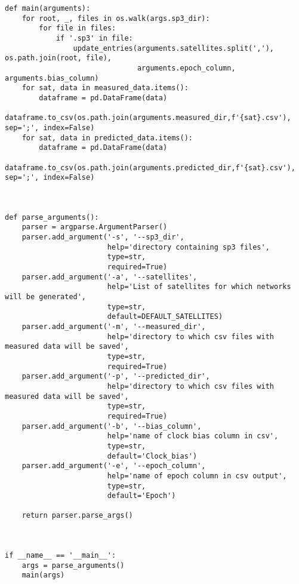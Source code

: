 \begin{lstlisting}[frame=single]
def main(arguments):
    for root, _, files in os.walk(args.sp3_dir):
        for file in files:
            if '.sp3' in file:
                update_entries(arguments.satellites.split(','), os.path.join(root, file),
                               arguments.epoch_column, arguments.bias_column)
    for sat, data in measured_data.items():
        dataframe = pd.DataFrame(data)
        dataframe.to_csv(os.path.join(arguments.measured_dir,f'{sat}.csv'), sep=';', index=False)
    for sat, data in predicted_data.items():
        dataframe = pd.DataFrame(data)
        dataframe.to_csv(os.path.join(arguments.predicted_dir,f'{sat}.csv'),  sep=';', index=False)



def parse_arguments():
    parser = argparse.ArgumentParser()
    parser.add_argument('-s', '--sp3_dir',
                        help='directory containing sp3 files',
                        type=str,
                        required=True)
    parser.add_argument('-a', '--satellites',
                        help='List of satellites for which networks will be generated',
                        type=str,
                        default=DEFAULT_SATELLITES)
    parser.add_argument('-m', '--measured_dir',
                        help='directory to which csv files with measured data will be saved',
                        type=str,
                        required=True)
    parser.add_argument('-p', '--predicted_dir',
                        help='directory to which csv files with measured data will be saved',
                        type=str,
                        required=True)
    parser.add_argument('-b', '--bias_column',
                        help='name of clock bias column in csv',
                        type=str,
                        default='Clock_bias')
    parser.add_argument('-e', '--epoch_column',
                        help='name of epoch column in csv output',
                        type=str,
                        default='Epoch')

    return parser.parse_args()



if __name__ == '__main__':
    args = parse_arguments()
    main(args)
\end{lstlisting}
